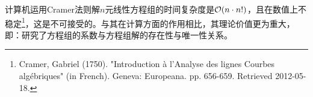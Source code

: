 \begin{remark}
	计算机运用Cramer法则解$n$元线性方程组的时间复杂度是$\mathcal O(n\cdot n!)$，且在数值上不稳定\footnote{Cramer, Gabriel (1750). "Introduction à l'Analyse des lignes Courbes algébriques" (in French). Geneva: Europeana. pp. 656-659. Retrieved 2012-05-18.}，这是不可接受的。与其在计算方面的作用相比，其理论价值更为重大，即：研究了方程组的系数与方程组解的存在性与唯一性关系。
\end{remark}
